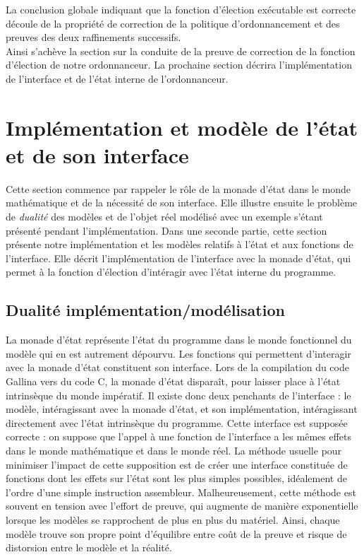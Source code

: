 	La conclusion globale indiquant que la fonction d'élection exécutable est correcte découle de la propriété de correction de la politique d'ordonnancement et des preuves des deux raffinements successifs.\\

	Ainsi s'achève la section sur la conduite de la preuve de correction de la fonction d'élection de notre ordonnanceur. La prochaine section décrira l'implémentation de l'interface et de l'état interne de l'ordonnanceur.

	\section{Implémentation et modèle de l'état et de son interface}

	\label{sec:sched_impl}

	Cette section commence par rappeler le rôle de la monade d'état dans le monde mathématique et de la nécessité de son interface. Elle illustre ensuite le problème de \emph{dualité} des modèles et de l'objet réel modélisé avec un exemple s'étant présenté pendant l'implémentation.
	Dans une seconde partie, cette section présente notre implémentation et les modèles relatifs à l'état et aux fonctions de l'interface. Elle décrit l'implémentation de l'interface avec la monade d'état, qui permet à la fonction d'élection d'intéragir avec l'état interne du programme.
		\subsection{Dualité implémentation/modélisation}
		\label{sec:model_distortion}
			La monade d'état représente l'état du programme dans le monde fonctionnel du modèle qui en est autrement dépourvu. Les fonctions qui permettent d'interagir avec la monade d'état constituent son interface. Lors de la compilation du code Gallina vers du code C, la monade d'état disparaît, pour laisser place à l'état intrinsèque du monde impératif.
			Il existe donc deux penchants de l'interface : le modèle, intéragissant avec la monade d'état, et son implémentation, intéragissant directement avec l'état intrinsèque du programme. Cette interface est supposée correcte : on suppose que l'appel à une fonction de l'interface a les mêmes effets dans le monde mathématique et dans le monde réel. La méthode usuelle pour minimiser l'impact de cette supposition est de créer une interface constituée de fonctions dont les effets sur l'état sont les plus simples possibles, idéalement de l'ordre d'une simple instruction assembleur.
			Malheureusement, cette méthode est souvent en tension avec l'effort de preuve, qui augmente de manière exponentielle lorsque les modèles se rapprochent de plus en plus du matériel. Ainsi, chaque modèle trouve son propre point d'équilibre entre coût de la preuve et risque de distorsion entre le modèle et la réalité.

